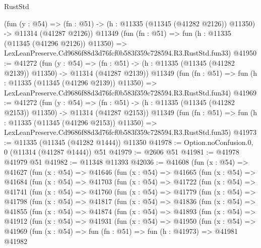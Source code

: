 \begin{lexlean}{RustStd}
\begin{coremodule}
    (fun (y : @54) =>
    (fn : @51) -> (h : @11335 (@11345 (@41282 @2126)) @11350) -> @11314 (@41287 @2126))
    @11349
    (fun (fn : @51) =>
    fun (h : @11335 (@11345 (@41296 @2126)) @11350) =>
    LexLeanPreserve.Cd9686f88d3d76fcf0b583f359c728594.R3.RustStd.fun33)
@41950 := @41272
    (fun (y : @54) =>
    (fn : @51) -> (h : @11335 (@11345 (@41282 @2139)) @11350) -> @11314 (@41287 @2139))
    @11349
    (fun (fn : @51) =>
    fun (h : @11335 (@11345 (@41296 @2139)) @11350) =>
    LexLeanPreserve.Cd9686f88d3d76fcf0b583f359c728594.R3.RustStd.fun34)
@41969 := @41272
    (fun (y : @54) =>
    (fn : @51) -> (h : @11335 (@11345 (@41282 @2153)) @11350) -> @11314 (@41287 @2153))
    @11349
    (fun (fn : @51) =>
    fun (h : @11335 (@11345 (@41296 @2153)) @11350) =>
    LexLeanPreserve.Cd9686f88d3d76fcf0b583f359c728594.R3.RustStd.fun35)
@41973 := @11335 (@11345 (@41282 @1444)) @11350
@41978 := Option.noConfusion.{0, 0} (@11314 (@41287 @1444)) @51
@41979 := @2606 @51
@41981 := @41978 @41979 @51
@41982 := @11348 @11393
@42036 := @41608
    (fun (x : @54) =>
    @41627
      (fun (x : @54) =>
      @41646
        (fun (x : @54) =>
        @41665
          (fun (x : @54) =>
          @41684
            (fun (x : @54) =>
            @41703
              (fun (x : @54) =>
              @41722
                (fun (x : @54) =>
                @41741
                  (fun (x : @54) =>
                  @41760
                    (fun (x : @54) =>
                    @41779
                      (fun (x : @54) =>
                      @41798
                        (fun (x : @54) =>
                        @41817
                          (fun (x : @54) =>
                          @41836
                            (fun (x : @54) =>
                            @41855
                              (fun (x : @54) =>
                              @41874
                                (fun (x : @54) =>
                                @41893
                                  (fun (x : @54) =>
                                  @41912
                                    (fun (x : @54) =>
                                    @41931
                                      (fun (x : @54) =>
                                      @41950
                                        (fun (x : @54) =>
                                        @41969
                                          (fun (x : @54) =>
                                          fun (fn : @51) =>
                                          fun (h : @41973) =>
                                          @41981
                                            @41982

\end{coremodule}
\end{lexlean}
